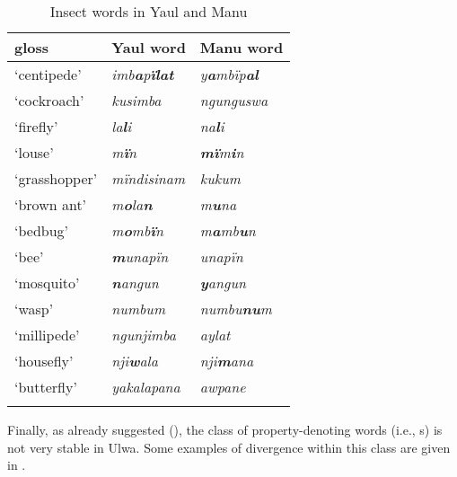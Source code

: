 \begin{table}
\caption{Insect words in Yaul and Manu}
\label{tab:18.25}


\begin{tabular}{lll}

\lsptoprule

gloss & Yaul word & Manu word\\
\midrule
‘centipede’ & {\itshape imb\textbf{a}p\textbf{ïlat}} & {\itshape y\textbf{a}mbïp\textbf{al}}\\
‘cockroach’ & {\itshape kusimba} & {\itshape ngunguswa}\\
‘firefly’ & {\itshape la\textbf{l}i} & {\itshape na\textbf{l}i}\\
‘louse’ & {\itshape m\textbf{ï}n} & {\itshape \textbf{mï}m\textbf{i}n}\\
‘grasshopper’ & {\itshape mïndisinam} & {\itshape kukum}\\
‘brown ant’ & {\itshape m\textbf{o}la\textbf{n}} & {\itshape m\textbf{u}na}\\
‘bedbug’ & {\itshape m\textbf{o}mb\textbf{ï}n} & {\itshape m\textbf{a}mb\textbf{u}n}\\
‘bee’ & {\itshape \textbf{m}unapïn} & {\itshape unapïn}\\
‘mosquito’ & {\itshape \textbf{n}angun} & {\itshape \textbf{y}angun}\\
‘wasp’ & {\itshape numbum} & {\itshape numbu\textbf{nu}m}\\
‘millipede’ & {\itshape ngunjimba} & {\itshape aylat}\\
‘housefly’ & {\itshape nji\textbf{w}ala} & {\itshape nji\textbf{m}ana}\\
‘butterfly’ & {\itshape yakalapana} & {\itshape awpane}\\
\lspbottomrule
\end{tabular}
\end{table}


  Finally, as already suggested (), the class of property-denoting words (i.e., s) is not very stable in Ulwa. Some examples of  divergence within this class are given in .

